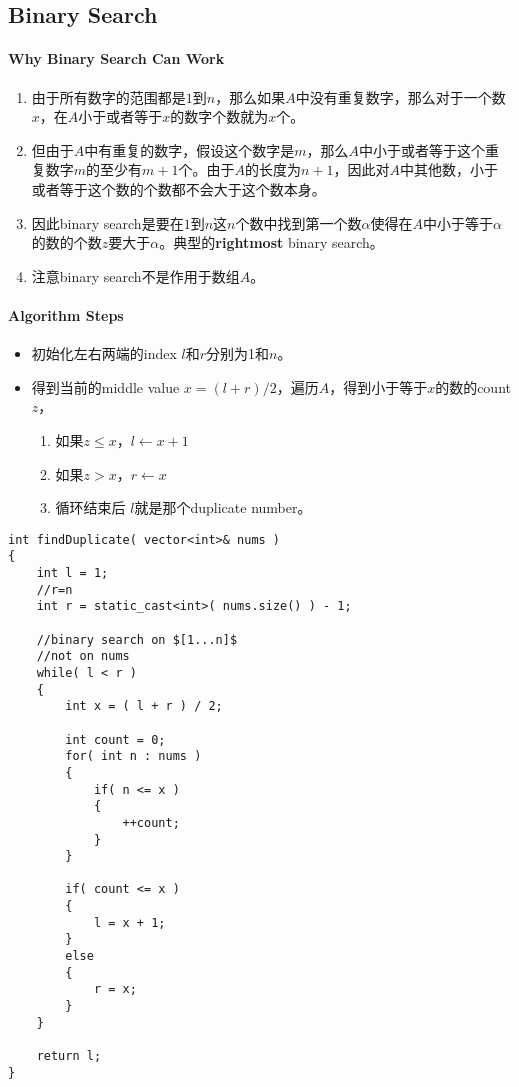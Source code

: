 \subsection{Binary Search}
\paragraph{Why Binary Search Can Work}
\begin{enumerate}
\item 由于所有数字的范围都是$1$到$n$，那么如果$A$中没有重复数字，那么对于一个数$x$，在$A$小于或者等于$x$的数字个数就为$x$个。
\item 但由于$A$中有重复的数字，假设这个数字是$m$，那么$A$中小于或者等于这个重复数字$m$的至少有$m+1$个。由于$A$的长度为$n+1$，因此对$A$中其他数，小于或者等于这个数的个数都不会大于这个数本身。
\item 因此binary search是要在$1$到$n$这$n$个数中找到第一个数$\alpha$使得在$A$中小于等于$\alpha$的数的个数$z$要大于$\alpha$。典型的\textbf{rightmost} binary search。
\item 注意binary search不是作用于数组$A$。
\end{enumerate}
\paragraph{Algorithm Steps}
\begin{itemize}
\item 初始化左右两端的index $l$和$r$分别为1和$n$。
\item 得到当前的middle value $x=(l+r)/2$，遍历$A$，得到小于等于$x$的数的count $z$，
\begin{enumerate}
\item 如果$z\leq x$，$l\gets x+1$
\item 如果$z > x$，$r\gets x$
\item 循环结束后 $l$就是那个duplicate number。
\end{enumerate}
\end{itemize}

\begin{lstlisting}[style=customc, caption={Binary Search}]
int findDuplicate( vector<int>& nums )
{
    int l = 1;
    //r=n
    int r = static_cast<int>( nums.size() ) - 1;

    //binary search on $[1...n]$
    //not on nums
    while( l < r )
    {
        int x = ( l + r ) / 2;

        int count = 0;
        for( int n : nums )
        {
            if( n <= x )
            {
                ++count;
            }
        }

        if( count <= x )
        {
            l = x + 1;
        }
        else
        {
            r = x;
        }
    }

    return l;
}
\end{lstlisting}

